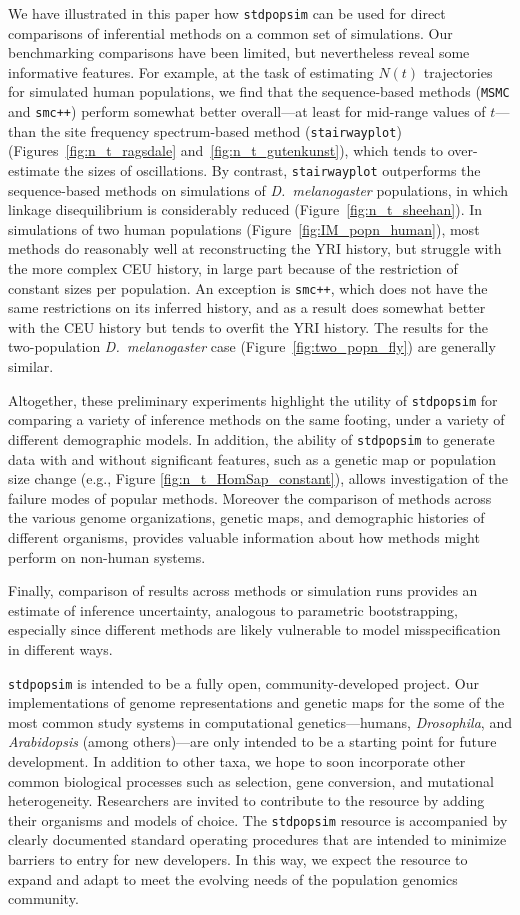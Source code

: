 \documentclass[12pt,halfline,a4paper]{ouparticle}
\newcommand{\stdpopsim}{\texttt{stdpopsim}\xspace}
\newcommand{\MSMC}{\texttt{MSMC}\xspace}
\newcommand{\smcpp}{\texttt{smc++}\xspace}
\newcommand{\stairwayplot}{\texttt{stairwayplot}\xspace}
\begin{document}
We have illustrated in this paper how \stdpopsim can be used for direct
comparisons of inferential methods on a common set of simulations. Our
benchmarking comparisons have been limited, but nevertheless
reveal some informative features. For
example, at the task of estimating $N(t)$ trajectories for simulated human
populations, we find that the sequence-based methods (\MSMC and \smcpp)
perform somewhat better overall---at least for mid-range values of
$t$---than the site frequency spectrum-based method (\stairwayplot)
(Figures~\ref{fig:n_t_ragsdale} and~\ref{fig:n_t_gutenkunst}), which
tends to over-estimate the sizes of oscillations.  By contrast,
\stairwayplot outperforms the sequence-based methods
on simulations of \textit{D.~melanogaster} populations,
in which linkage disequilibrium is considerably reduced (Figure~\ref{fig:n_t_sheehan}).
In simulations of two human populations
(Figure~\ref{fig:IM_popn_human}), most methods do reasonably well at
reconstructing the YRI history, but struggle with the more complex CEU
history, in large part because of the restriction of constant sizes per
population.  An exception is \smcpp, which does not have the same
restrictions on its inferred history, and as a result does somewhat better
with the CEU history but tends to overfit the YRI history.  The results for
the two-population \textit{D.~melanogaster} case (Figure~\ref{fig:two_popn_fly})
are generally similar.

Altogether, these preliminary experiments highlight
the utility of \stdpopsim for comparing a variety of inference methods on
the same footing, under a variety of different demographic models.
In addition, the ability of \stdpopsim to generate data with and without significant features, such
as a genetic map or population size change (e.g., Figure \ref{fig:n_t_HomSap_constant}), allows
investigation of the failure modes of popular methods.
Moreover the comparison of methods across the various genome organizations, genetic maps,
and demographic histories of different organisms, provides valuable information
about how methods might perform on non-human systems.

Finally, comparison of results across methods or simulation runs
provides an estimate of inference uncertainty, analogous to parametric
bootstrapping,
especially since different methods are likely vulnerable to model misspecification
in different ways.

\stdpopsim is intended to be a fully open, community-developed project.
Our implementations of genome representations and genetic maps for the some of
the most common study systems in computational genetics---humans, \textit{Drosophila},
and \textit{Arabidopsis} (among others)---are only intended to be a starting point for
future development.  In addition to other taxa,
we hope to soon incorporate other common biological processes
such as selection, gene conversion, and mutational heterogeneity.
Researchers are invited to contribute to the resource by adding their
organisms and models of choice. The \stdpopsim resource is
accompanied by clearly documented standard operating procedures that are
intended to minimize barriers to entry for new developers.  In this way, we
expect the resource to expand and adapt to meet the evolving needs of the
population genomics community.
\end{document}
